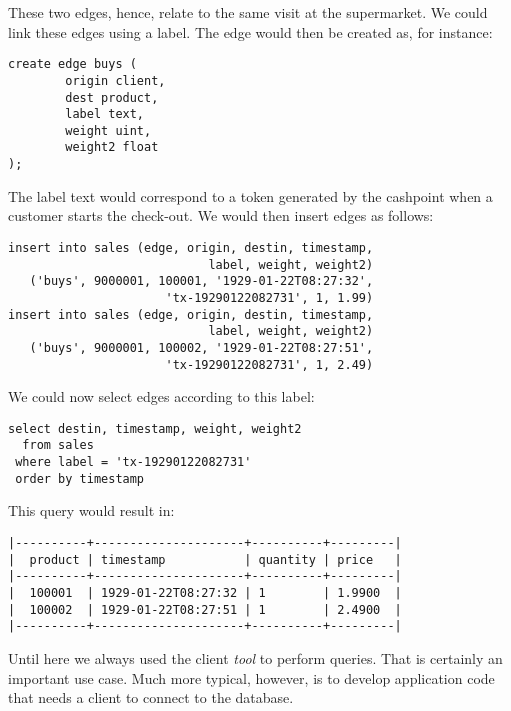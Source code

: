 These two edges, hence, relate to the same visit at the supermarket.
We could link these edges using a label. The edge would then be created
as, for instance:

\begin{sqlcode}
\begin{lstlisting}
create edge buys (
        origin client,
        dest product,
        label text,
        weight uint,
        weight2 float
);
\end{lstlisting}
\end{sqlcode}

The label text would correspond to a token generated by
the cashpoint when a customer starts the check-out.
We would then insert edges as follows:

\begin{sqlcode}
\begin{lstlisting}
insert into sales (edge, origin, destin, timestamp,
                            label, weight, weight2)
   ('buys', 9000001, 100001, '1929-01-22T08:27:32',
                      'tx-19290122082731', 1, 1.99)
insert into sales (edge, origin, destin, timestamp,
                            label, weight, weight2)
   ('buys', 9000001, 100002, '1929-01-22T08:27:51', 
                      'tx-19290122082731', 1, 2.49)
\end{lstlisting}
\end{sqlcode}

We could now select edges according to this label:

\begin{sqlcode}
\begin{lstlisting}
select destin, timestamp, weight, weight2
  from sales 
 where label = 'tx-19290122082731'
 order by timestamp
\end{lstlisting}
\end{sqlcode}

This query would result in:

\begin{verbatim}
|----------+---------------------+----------+---------|
|  product | timestamp           | quantity | price   |
|----------+---------------------+----------+---------|
|  100001  | 1929-01-22T08:27:32 | 1        | 1.9900  |
|  100002  | 1929-01-22T08:27:51 | 1        | 2.4900  |
|----------+---------------------+----------+---------|
\end{verbatim}

Until here we always used the client \emph{tool}
to perform queries.
That is certainly an important use case.
Much more typical, however, is to develop application code
that needs a client  to connect to the database.

